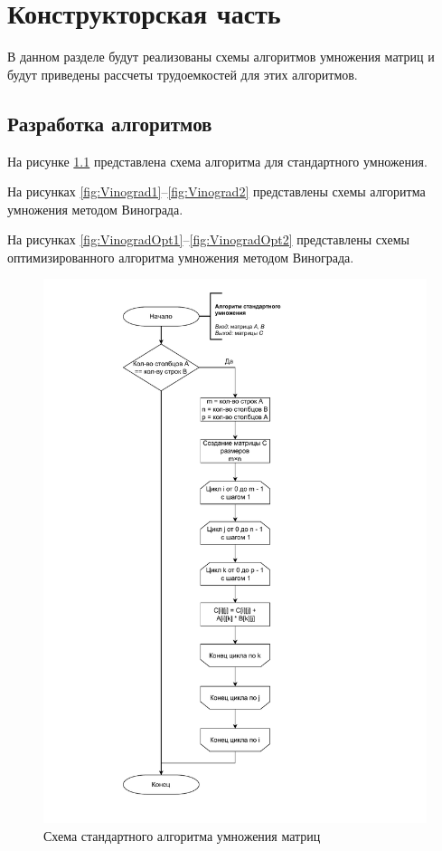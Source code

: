 \chapter{Конструкторская часть}
В данном разделе будут реализованы схемы алгоритмов умножения матриц и будут приведены рассчеты трудоемкостей для этих алгоритмов.

\section{Разработка алгоритмов}
На рисунке \ref{fig:Stand} представлена схема алгоритма для стандартного умножения.

На рисунках \ref{fig:Vinograd1}--\ref{fig:Vinograd2} представлены схемы алгоритма умножения методом Винограда.

На рисунках \ref{fig:VinogradOpt1}--\ref{fig:VinogradOpt2} представлены схемы оптимизированного алгоритма умножения методом Винограда.

\begin{figure}[h]
	\centering
	\includegraphics[height=0.9\textheight, page=1]{img/algorithms.pdf}
	\caption{Схема стандартного алгоритма умножения матриц}
	\label{fig:Stand}
\end{figure}

